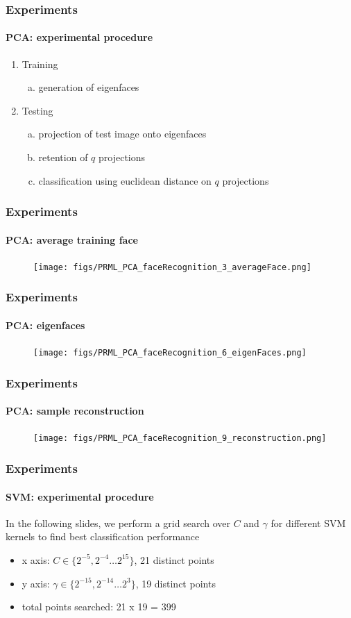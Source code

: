 \begin{frame}
\frametitle{Experiments}
\framesubtitle{PCA: experimental procedure}
\logoEvolution\mypagenum	
	\begin{enumerate}
		\item Training
			\begin{enumerate}[(a)]
				\item generation of eigenfaces
			\end{enumerate}
		\item Testing
			\begin{enumerate}[(a)]
				\item projection of test image onto eigenfaces
				\item retention of $q$ projections
				\item classification using euclidean distance on $q$ projections
			\end{enumerate}			
	\end{enumerate}
\end{frame}



\begin{frame}
\frametitle{Experiments}
\framesubtitle{PCA: average training face}
\logoEvolution\mypagenum	
	\begin{figure}
		\texttt{[image: figs/PRML\_PCA\_faceRecognition\_3\_averageFace.png]}
	\end{figure}
\end{frame}


\begin{frame}
\frametitle{Experiments}
\framesubtitle{PCA: eigenfaces}
\logoEvolution\mypagenum	
	\begin{figure}
		\texttt{[image: figs/PRML\_PCA\_faceRecognition\_6\_eigenFaces.png]}
	\end{figure}
\end{frame}


\begin{frame}
\frametitle{Experiments}
\framesubtitle{PCA: sample reconstruction}
\logoEvolution\mypagenum	
	\begin{figure}
		\texttt{[image: figs/PRML\_PCA\_faceRecognition\_9\_reconstruction.png]}
	\end{figure}
\end{frame}


\begin{frame}
\frametitle{Experiments}
\framesubtitle{SVM: experimental procedure}
\mypagenum
	In the following slides, we perform a grid search over $C$ and $\gamma$ for different SVM kernels to find best classification performance
	\begin{itemize}
		\item {\color{blue}x axis:} $C \in \{2^{-5}, 2^{-4} \ldots 2^{15}\}$, 21 distinct points
		\item {\color{blue}y axis:} $\gamma \in \{2^{-15}, 2^{-14} \ldots 2^{3}\}$, 19 distinct points
		\item {\color{blue}total points searched:} 21 x 19 = 399
	\end{itemize}
\end{frame}



